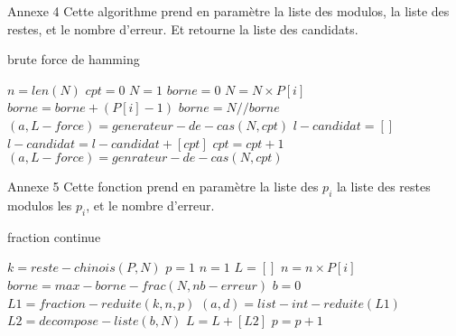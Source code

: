 \documentclass[a4paper, 11pt]{report}
\begin{document}
\begin{appendices}
    Annexe 4 \newline
    Cette algorithme prend en paramètre la liste des modulos, la liste des restes, et le nombre d'erreur. Et retourne la liste des candidats.
    \begin{algorithm}
        \caption{brute force de hamming}
        \begin{algorithmic}
            \STATE $n=len(N)$
            \STATE $cpt=0 $
            \STATE $N=1$
            \STATE $borne=0$
            \STATE $N=N\times P[i]$
            \STATE $borne=borne+ (P[i]-1)$
            \ENDFOR
            \STATE $borne=N//borne$
            \STATE $(a,L-force)= generateur-de-cas(N,cpt) $
            \STATE $l-candidat=[]$
            \STATE $l-candidat = l-candidat+[cpt]$
            \ENDIF
            \STATE $cpt=cpt+1$
            \STATE $(a,L-force)=genrateur-de-cas(N,cpt)$
            \ENDWHILE
        \end{algorithmic}
    \end{algorithm}
\end{appendices}

\newpage

\begin{appendices}
    Annexe 5
    Cette fonction prend en paramètre la liste des $p_i$ la liste des restes modulos les $p_i$, et le nombre d'erreur.
    \begin{algorithm}
        \caption{fraction continue}
        \begin{algorithmic}
            \STATE $k=reste-chinois(P,N)$
            \STATE $p=1$
            \STATE $n=1$
            \STATE $L=[]$
            \STATE $n=n\times P[i]$
            \ENDFOR
            \STATE $borne=max-borne-frac(N,nb-erreur)$
            \STATE $b=0$
            \STATE $L1= fraction-reduite(k,n,p)$
            \STATE $(a,d)=list-int-reduite(L1)$
            \STATE $L2=decompose-liste(b,N)$
            \STATE $L=L+[L2]$
            \ENDIF
            \STATE $p=p+1$
            \ENDWHILE
        \end{algorithmic}
    \end{algorithm}
\end{appendices}
\end{document}

